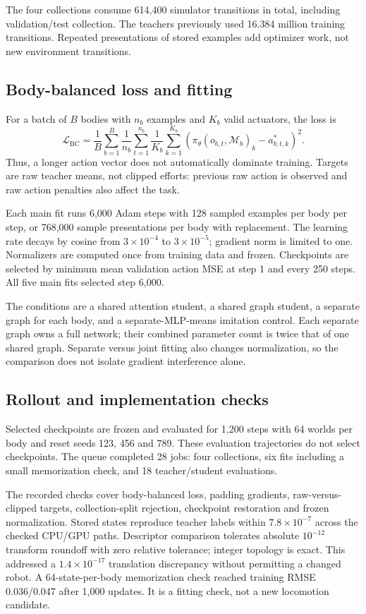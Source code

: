 \documentclass[11pt,letterpaper]{article}
\newcommand{\mech}{\mathcal{M}}
\newcommand{\policy}{\pi_\theta}
\begin{document}
The four collections consume 614,400 simulator transitions in total, including
validation/test collection. The teachers previously used 16.384 million training
transitions. Repeated presentations of stored examples add optimizer work, not
new environment transitions.

\subsection{Body-balanced loss and fitting}
For a batch of $B$ bodies with $n_b$ examples and $K_b$ valid actuators, the loss is
\begin{equation}
 \mathcal L_{\mathrm{BC}}=
 \frac{1}{B}\sum_{b=1}^{B}\frac{1}{n_b}\sum_{t=1}^{n_b}
 \frac{1}{K_b}\sum_{k=1}^{K_b}
 \left(\policy(o_{b,t},\mech_b)_k-a^*_{b,t,k}\right)^2.
 \label{eq:bc}
\end{equation}
Thus, a longer action vector does not automatically dominate training. Targets
are raw teacher means, not clipped efforts: previous raw action is observed and
raw action penalties also affect the task.

Each main fit runs 6,000 Adam steps with 128 sampled examples per body per step,
or 768,000 sample presentations per body with replacement. The learning rate
decays by cosine from $3\times10^{-4}$ to $3\times10^{-5}$; gradient norm is
limited to one. Normalizers are computed once from training data and frozen.
Checkpoints are selected by minimum mean validation action MSE at step 1 and
every 250 steps. All five main fits selected step 6,000.

The conditions are a shared attention student, a shared graph student, a separate
graph for each body, and a separate-MLP-means imitation control. Each separate
graph owns a full network; their combined parameter count is twice that of one
shared graph. Separate versus joint fitting also changes normalization, so the
comparison does not isolate gradient interference alone.

\subsection{Rollout and implementation checks}
Selected checkpoints are frozen and evaluated for 1,200 steps with 64 worlds per
body and reset seeds 123, 456 and 789. These evaluation trajectories do not select
checkpoints. The queue completed 28 jobs: four collections, six fits including a
small memorization check, and 18 teacher/student evaluations.

The recorded checks cover body-balanced loss, padding gradients, raw-versus-clipped
targets, collection-split rejection, checkpoint restoration and frozen
normalization. Stored states reproduce teacher labels within $7.8\times10^{-7}$
across the checked CPU/GPU paths. Descriptor comparison tolerates absolute
$10^{-12}$ transform roundoff with zero relative tolerance; integer topology is
exact. This addressed a $1.4\times10^{-17}$ translation discrepancy without
permitting a changed robot. A 64-state-per-body memorization check reached
training RMSE 0.036/0.047 after 1,000 updates. It is a fitting check, not a new
locomotion candidate.
\end{document}
